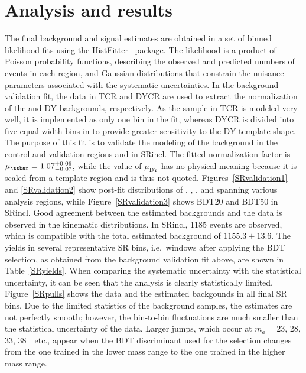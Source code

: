\documentclass[cernpreprint, backref=false, texlive=2020, UKenglish, dvipsnames, block=none, texmf]{atlasdoc}
\begin{document}
\section{Analysis and results}
\label{sec:result}
The final background and signal estimates are obtained in a set of binned likelihood fits \cite{Cowan:2010js}  using the HistFitter~\cite{Baak:2014wma} package.
The likelihood is a product of Poisson probability functions, describing the observed and predicted numbers of events in each region, and Gaussian distributions that constrain the nuisance parameters associated with the systematic uncertainties.
In the background validation fit, the data in TCR and DYCR are used to extract the normalization of the \ttbar and DY backgrounds, respectively.
As the \ttbar sample in TCR is modeled very well, it is implemented as only one bin in the fit, whereas DYCR is divided into five equal-width bins in \Mmm to provide greater sensitivity to the DY template shape.
The purpose of this fit is to validate the modeling of the background in the control and validation regions and in SRincl. The fitted \ttbar normalization factor is $\mu_{\ttbar}=1.07^{+0.06}_{-0.07}$, while the value of $\mu_\text{DY}$ has no physical meaning because it is scaled from a template region and is thus not quoted. Figures~\ref{SRvalidation1} and \ref{SRvalidation2} show post-fit distributions of \KLMbbmm, \met, \LogL, and \Mmm spanning various analysis regions, while Figure~\ref{SRvalidation3} shows BDT20 and BDT50 in SRincl. Good agreement between the estimated backgrounds and the data is observed in the kinematic distributions.
In SRincl, 1185 events are observed, which is compatible with the total estimated background of $1155.3 \pm 13.6$.
The yields in several representative SR bins, i.e.\ \Mmm windows after applying the BDT selection, as obtained from the background validation fit above, are shown in Table~\ref{SRyields}. When comparing the systematic uncertainty with the statistical uncertainty, it can be seen that the analysis is clearly statistically limited.
Figure~\ref{SRpulls} shows the data and the estimated backgounds in all final SR bins. Due to the limited statistics of the background samples, the estimates are not perfectly smooth; however, the bin-to-bin fluctuations are much smaller than the statistical uncertainty of the data. Larger jumps, which occur at $m_a = 23$, 28, 33, 38~\GeV\ etc., appear when the BDT discriminant used for the selection changes from the one trained in the lower mass range to the one trained in the higher mass range.
 
\end{document}
